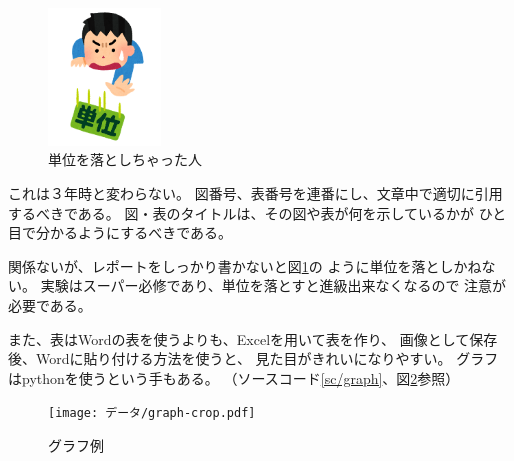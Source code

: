 \documentclass[autodetect-engine,dvipdfmx-if-dvi,ja=standard]{bxjsarticle}
\begin{document}
\begin{figure}
    \vspace{-1\baselineskip}
    \centering
    \includegraphics[width=3cm]{データ/単位を落とす人.png}
    \caption{単位を落としちゃった人}
    \label{img/単位}
    \vspace{-1\baselineskip}
\end{figure}

これは３年時と変わらない。
図番号、表番号を連番にし、文章中で適切に引用するべきである。
図・表のタイトルは、その図や表が何を示しているかが
ひと目で分かるようにするべきである。

関係ないが、レポートをしっかり書かないと図\ref{img/単位}の
ように単位を落としかねない。
実験はスーパー必修であり、単位を落とすと進級出来なくなるので
注意が必要である。

また、表はWordの表を使うよりも、Excelを用いて表を作り、
画像として保存後、Wordに貼り付ける方法を使うと、
見た目がきれいになりやすい。
グラフはpythonを使うという手もある。
（ソースコード\ref{sc/graph}、図\ref{img/graph}参照）




\begin{figure}[h]
	\centering
	\texttt{[image: データ/graph-crop.pdf]}
	\caption{グラフ例}
    \label{img/graph}
    \vspace{-1\baselineskip}
\end{figure}
\end{document}
